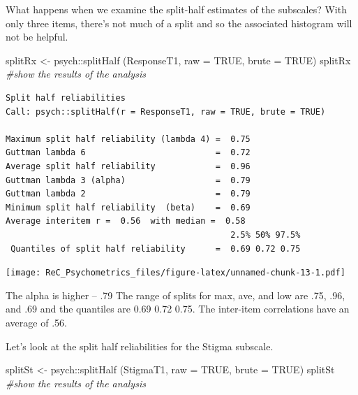 \documentclass[
  english,
]{book}
\newenvironment{Shaded}{\begin{snugshade}}{\end{snugshade}}
\newcommand{\AttributeTok}[1]{\textcolor[rgb]{0.77,0.63,0.00}{#1}}
\newcommand{\CommentTok}[1]{\textcolor[rgb]{0.56,0.35,0.01}{\textit{#1}}}
\newcommand{\ConstantTok}[1]{\textcolor[rgb]{0.00,0.00,0.00}{#1}}
\newcommand{\DecValTok}[1]{\textcolor[rgb]{0.00,0.00,0.81}{#1}}
\newcommand{\FunctionTok}[1]{\textcolor[rgb]{0.00,0.00,0.00}{#1}}
\newcommand{\NormalTok}[1]{#1}
\newcommand{\OtherTok}[1]{\textcolor[rgb]{0.56,0.35,0.01}{#1}}
\newcommand{\SpecialCharTok}[1]{\textcolor[rgb]{0.00,0.00,0.00}{#1}}
\newcommand{\StringTok}[1]{\textcolor[rgb]{0.31,0.60,0.02}{#1}}
\begin{document}
What happens when we examine the split-half estimates of the subscales? With only three items, there's not much of a split and so the associated histogram will not be helpful.

\begin{Shaded}
\begin{Highlighting}[]
\NormalTok{splitRx }\OtherTok{\textless{}{-}}\NormalTok{ psych}\SpecialCharTok{::}\FunctionTok{splitHalf}\NormalTok{ (ResponseT1, }\AttributeTok{raw =} \ConstantTok{TRUE}\NormalTok{, }\AttributeTok{brute =} \ConstantTok{TRUE}\NormalTok{)}
\NormalTok{splitRx }\CommentTok{\#show the results of the analysis}
\end{Highlighting}
\end{Shaded}

\begin{verbatim}
Split half reliabilities  
Call: psych::splitHalf(r = ResponseT1, raw = TRUE, brute = TRUE)

Maximum split half reliability (lambda 4) =  0.75
Guttman lambda 6                          =  0.72
Average split half reliability            =  0.96
Guttman lambda 3 (alpha)                  =  0.79
Guttman lambda 2                          =  0.79
Minimum split half reliability  (beta)    =  0.69
Average interitem r =  0.56  with median =  0.58
                                             2.5% 50% 97.5%
 Quantiles of split half reliability      =  0.69 0.72 0.75
\end{verbatim}

\begin{Shaded}
\end{Shaded}

\texttt{[image: ReC\_Psychometrics\_files/figure-latex/unnamed-chunk-13-1.pdf]}

The alpha is higher -- .79 The range of splits for max, ave, and low are .75, .96, and .69 and the quantiles are 0.69 0.72 0.75. The inter-item correlations have an average of .56.

Let's look at the split half reliabilities for the Stigma subscale.

\begin{Shaded}
\begin{Highlighting}[]
\NormalTok{splitSt }\OtherTok{\textless{}{-}}\NormalTok{ psych}\SpecialCharTok{::}\FunctionTok{splitHalf}\NormalTok{ (StigmaT1, }\AttributeTok{raw =} \ConstantTok{TRUE}\NormalTok{, }\AttributeTok{brute =} \ConstantTok{TRUE}\NormalTok{)}
\NormalTok{splitSt }\CommentTok{\#show the results of the analysis}
\end{Highlighting}
\end{Shaded}
\end{document}
